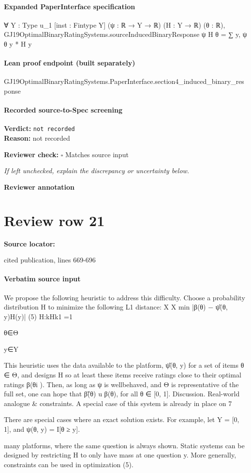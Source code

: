 \documentclass[10pt]{article}
\newcommand{\reviewerbox}{%
  \par\noindent\fbox{\parbox{0.96\linewidth}{\rule{0pt}{0.38in}}}\par
}
\newcommand{\reviewmatch}[1]{%
  \par\noindent\textbf{Reviewer check:} $\square$\; #1\par
  \noindent\emph{If left unchecked, explain the discrepancy or uncertainty below.}\par
}
\begin{document}
\paragraph{Expanded PaperInterface specification}
\begin{ReviewVerbatim}
∀ {Y : Type u_1} [inst : Fintype Y] (ψ : ℝ → Y → ℝ) (H : Y → ℝ) (θ : ℝ),
  GJ19OptimalBinaryRatingSystems.sourceInducedBinaryResponse ψ H θ = ∑ y, ψ θ y * H y
\end{ReviewVerbatim}

\paragraph{Lean proof endpoint (built separately)}\begin{ReviewVerbatim}
GJ19OptimalBinaryRatingSystems.PaperInterface.section4_induced_binary_response
\end{ReviewVerbatim}

\paragraph{Recorded source-to-Spec screening}
\textbf{Verdict:} \texttt{not recorded}
\\
\textbf{Reason:} not recorded
\reviewmatch{Matches source input}
\noindent\textbf{Reviewer annotation}\par
\reviewerbox
\clearpage
\hypertarget{source-claim-3fed172202fb05fc}{}
\section*{Review row 21}
\textbf{Source locator:} {\footnotesize\raggedright cited publication, lines 669-\allowbreak{}696\par}
\paragraph{Verbatim source input}
\begin{ReviewVerbatim}
We propose the following heuristic to address this
difficulty. Choose a probability distribution H to
minimize the following L1 distance:
X
X
min
|β(θ) −
ψ̂(θ, y)H(y)|
(5)
H:kHk1 =1

θ∈Θ

y∈Y

This heuristic uses the data available to the platform, ψ̂(θ, y) for a set of items θ ∈ Θ, and designs H
so at least these items receive ratings close to their
optimal ratings β(θi ). Then, as long as ψ is wellbehaved, and Θ is representative of the full set, one
can hope that β̃(θ) u β(θ), for all θ ∈ [0, 1].
Discussion. Real-world analogue & constraints. A
special case of this system is already in place on
7

There are special cases where an exact solution exists. For example, let Y = [0, 1], and ψ(θ, y) = I[θ ≥ y].

many platforms, where the same question is always
shown. Static systems can be designed by restricting
H to only have mass at one question y. More generally, constraints can be used in optimization (5).
\end{ReviewVerbatim}
\end{document}
